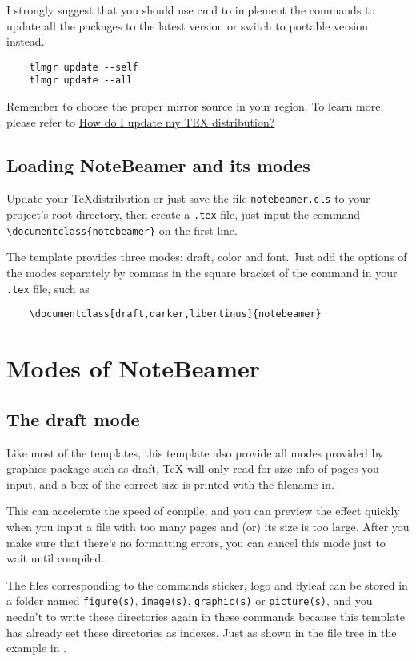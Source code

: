 \documentclass[11pt]{article}
\makeatletter
\def\@pkg#1{\texorpdfstring{\href{https://www.ctan.org/pkg/#1}{\textcolor{pkgcolor}{\textsf{#1}}}}{“#1”}}
\def\s@pkg#1{\texorpdfstring{\textcolor{pkgcolor}{\textsf{#1}}}{“#1”}}
\DeclareRobustCommand\pkg{\@ifstar\s@pkg\@pkg}
\def\mode#1{\texorpdfstring{\textcolor{moducolor}{\textsf{#1}}}{“#1”}}
\def\cmd#1{\texorpdfstring{\textcolor{cmdcolor}{\textsf{#1}}}{“#1”}}
\makeatother
\begin{document}
I strongly suggest that you should use cmd to implement the commands to update all the packages to the latest version or switch to portable version instead.
\begin{verbatim}
    tlmgr update --self
    tlmgr update --all
\end{verbatim}

Remember to choose the proper mirror source in your region. To learn more, please refer to \href{https://tex.stackexchange.com/questions/55437/how-do-i-update-my-tex-distribution}{How do I update my TEX distribution?}

\subsection{Loading \pkg{NoteBeamer} and its modes}
Update your \sffamily\TeX distribution or just save the file \verb|notebeamer.cls| to your project's root directory, then create a \verb|.tex| file, just input the command \verb|\documentclass{notebeamer}| on the first line.

The template provides three modes: \mode{draft}, \mode{color} and \mode{font}. Just add the options of the modes separately by commas in the square bracket of the command in your \verb|.tex| file, such as

\begin{verbatim}
    \documentclass[draft,darker,libertinus]{notebeamer}
\end{verbatim}

\section{Modes of \pkg{NoteBeamer}}


\subsection{The \mode{draft} mode}
Like most of the templates, this template also provide all modes provided by \pkg{graphics} package such as \mode{draft}, \sffamily\TeX{} will only read for size info of pages you input, and a box of the correct size is printed with the filename in.

This can accelerate the speed of compile, and you can preview the effect quickly when you input a file with too many pages and (or) its size is too large. After you make sure that there's no formatting errors, you can cancel this mode just to wait until compiled.

The files corresponding to the commands \cmd{sticker}, \cmd{logo} and \cmd{flyleaf} can be stored in a folder named \verb|figure(s)|, \verb|image(s)|, \verb|graphic(s)| or \verb|picture(s)|, and you needn't to write these directories again in these commands because this template has already set these directories as indexes. Just as shown in the file tree in the example in .
\end{document}
